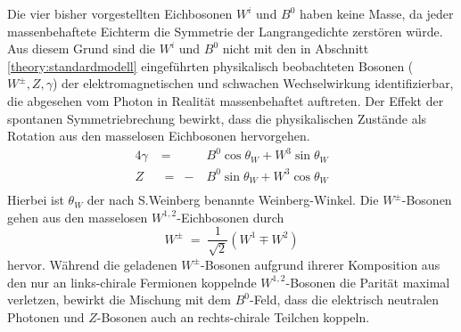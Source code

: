 Die vier bisher vorgestellten Eichbosonen $W^i$ und $B^0$ haben keine Masse, da
jeder massenbehaftete Eichterm die Symmetrie der Langrangedichte zerstören
würde. Aus diesem Grund sind die $W^i$ und $B^0$ nicht mit den in Abschnitt
\ref{theory:standardmodell} eingeführten physikalisch beobachteten Bosonen
($W^\pm, Z, \gamma$) der elektromagnetischen und schwachen Wechselwirkung
identifizierbar, die abgesehen vom Photon in Realität massenbehaftet auftreten.
Der Effekt der spontanen Symmetriebrechung bewirkt, dass die physikalischen
Zustände als Rotation aus den masselosen Eichbosonen hervorgehen.
\begin{alignat*}{4}
    \gamma &\;=\;  &B^0 \cos\theta_W + W^3\sin\theta_W \\
    Z      &\;=\; -&B^0 \sin\theta_W + W^3\cos\theta_W \\
\end{alignat*}
Hierbei ist $\theta_W$ der nach S.Weinberg benannte Weinberg-Winkel. Die
$W^\pm$-Bosonen gehen aus den masselosen $W^{1,2}$-Eichbosonen durch
\begin{equation*}
    W^\pm \;=\; \frac{1}{\sqrt{2}} \left( W^1 \mp W^2 \right)
\end{equation*}
hervor. Während die geladenen $W^\pm$-Bosonen aufgrund ihrerer Komposition aus
den nur an links-chirale Fermionen koppelnde $W^{1,2}$-Bosonen die Parität
maximal verletzen, bewirkt die Mischung mit dem $B^0$-Feld, dass die elektrisch
neutralen Photonen und $Z$-Bosonen auch an rechts-chirale Teilchen koppeln.

